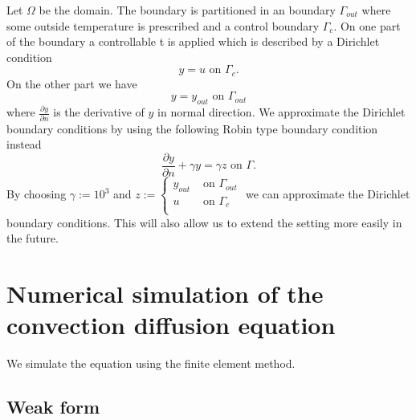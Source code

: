 \documentclass[
12pt, %
a4paper, %
onecolumn, %
portrait %
]{article}
\begin{document}
Let $\Omega$ be the domain. The boundary is partitioned in an boundary $\Gamma_{out}$ where some outside temperature is prescribed and a control boundary $\Gamma_c$. On one part of the boundary a controllable t is applied which is described by a Dirichlet condition
\begin{equation}
y = u \text{ on } \Gamma_c.
\end{equation}
On the other part we have
\begin{equation}
y = y_{out} \text{ on } \Gamma_{out}
\end{equation}
where $\frac{\partial y}{\partial n}$ is the derivative of $y$ in normal direction.
We approximate the Dirichlet boundary conditions by using the following Robin type boundary condition instead
\begin{equation}
\frac{\partial y}{\partial n} + \gamma y = \gamma z \text{ on } \Gamma.
\label{eq:robin-bc}
\end{equation}
By choosing 
$\gamma := 10^3$ and
$z := \begin{cases}
y_{out} &\text{ on } \Gamma_{out} \\ 
u &\text{ on } \Gamma_c \\
\end{cases}
$
we can approximate the Dirichlet boundary conditions. This will also allow us to extend the setting more easily in the future.
\begin{center}
\end{center}
\section{Numerical simulation of the convection diffusion equation}
We simulate the equation using the finite element method.
\subsection{Weak form}
\newcommand{\Ft}[1]{\langle F(t), {#1} \rangle}
\newcommand{\Bt}[2]{\langle B {#1}, {#2} \rangle}
\newcommand{\Fk}[1]{\langle F_k, {#1} \rangle}
\newcommand{\Fte}[2]{\alpha \go {#1} \bi{}{#2}{\Go}}
\newcommand{\Bte}[2]{\alpha \gc {#1} \bi{}{#2}{\Gc}}
\newcommand{\at}[2]{a(t; {#1},{#2})}
\newcommand{\ate}[2]{\alpha \ltwospe{\nabla {#1}}{\nabla {#2}} + \int_{\Omega} (w \cdot \nabla {#1}) {#2} \; dx + \alpha\gc \bi{{#1}}{{#2}}{\Gc} + \alpha \go \bi{{#1}}{{#2}}{\Go}}
\end{document}
